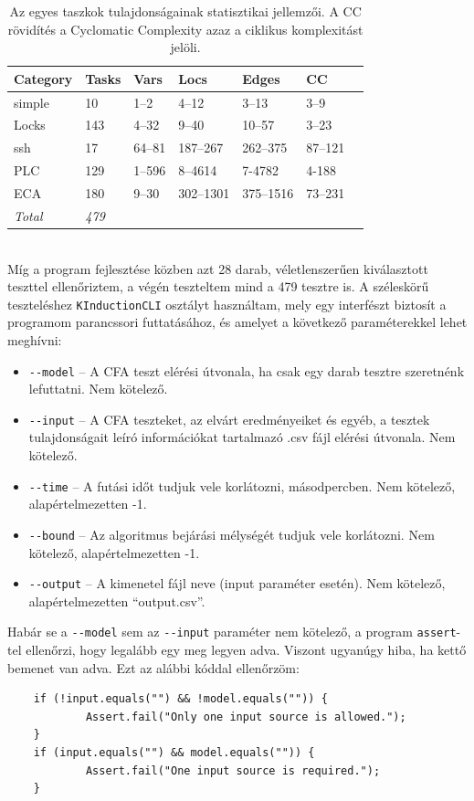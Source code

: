 \begin{table}[h] 
	\centering
	\begin{tabular}{lllllll}
		\toprule
		Category & Tasks & Vars & Locs & Edges & CC\\
		\midrule
		simple & 10 & 1--2 & 4--12 & 3--13 & 3--9\\
		Locks & 143 & 4--32 & 9--40 & 10--57 & 3--23\\
		ssh & 17 & 64--81 & 187--267 & 262--375 & 87--121\\
		PLC & 129 & 1--596 & 8--4614 & 7-4782 & 4-188\\
		ECA & 180 & 9--30 & 302--1301 & 375--1516 & 73--231\\
		
		\bottomrule
		\textit{Total} & \textit{479}\\
	\end{tabular}
	\caption{Az egyes taszkok tulajdonságainak statisztikai jellemzői. A CC rövidítés a Cyclomatic Complexity azaz a ciklikus komplexitást jelöli.}
	\label{table:tasksStat}
\end{table}
\ \\
Míg a program fejlesztése közben azt 28 darab, véletlenszerűen kiválasztott teszttel ellenőriztem, a végén teszteltem mind a 479 tesztre is. A széleskörű teszteléshez \texttt{KInductionCLI} osztályt használtam, mely egy interfészt biztosít a programom parancssori futtatásához, és amelyet a következő paraméterekkel lehet meghívni:

\begin{itemize}
	\item \texttt{-{}-model} -- A CFA teszt elérési útvonala, ha csak egy darab tesztre szeretnénk lefuttatni. Nem kötelező.
	\item \texttt{-{}-input} -- A CFA teszteket, az elvárt eredményeiket és egyéb, a tesztek tulajdonságait leíró információkat tartalmazó .csv fájl elérési útvonala. Nem kötelező.
	\item \texttt{-{}-time} -- A futási időt tudjuk vele korlátozni, másodpercben. Nem kötelező, alapértelmezetten -1.
	\item \texttt{-{}-bound} -- Az algoritmus bejárási mélységét tudjuk vele korlátozni. Nem kötelező, alapértelmezetten -1.
	\item \texttt{-{}-output} -- A kimenetel fájl neve (input paraméter esetén). Nem kötelező, alapértelmezetten ``output.csv''.
\end{itemize}
Habár se a \texttt{-{}-model} sem az \texttt{-{}-input} paraméter nem kötelező, a program \texttt{assert}-tel ellenőrzi, hogy legalább egy meg legyen adva. Viszont ugyanúgy hiba, ha kettő bemenet van adva. Ezt az alábbi kóddal ellenőrzöm:
\ \\
\begin{lstlisting}
	if (!input.equals("") && !model.equals("")) {
			Assert.fail("Only one input source is allowed.");
	}
	if (input.equals("") && model.equals("")) {
			Assert.fail("One input source is required.");
	}
\end{lstlisting}

